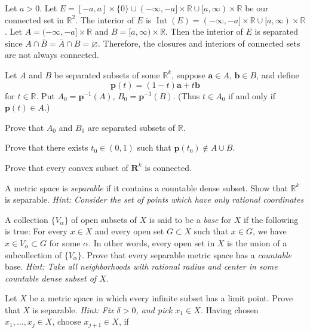 \begin{exercise}
  Let \(a > 0\).
  Let \(E = [-a,a]\times\{0\}\cup (-\infty,-a]\times\mathbb{R}\cup
  [a,\infty)\times\mathbb{R}\) be our connected set in \(\mathbb{R}^2\).
  The interior of \(E\) is
  \(\operatorname{Int}(E) = (-\infty,-a]\times\mathbb{R}\cup
  [a,\infty)\times\mathbb{R}\).
  Let \(A = (-\infty,-a]\times\mathbb{R}\) and
  \(B = [a,\infty)\times\mathbb{R}\).
  Then the interior of \(E\) is separated since
  \(A\cap\bar{B} = \bar{A}\cap B = \varnothing\).
  Therefore, the closures and interiors of connected sets are not always
  connected.
\item
  Let \(A\) and \(B\) be separated subsets of some \(\mathbb{R}^k\), suppose
  \(\mathbold{a}\in A\), \(\mathbold{b}\in B\), and define
  \[
  \mathbold{p}(t) = (1 - t)\mathbold{a} + t\mathbold{b}
  \]
  for \(t\in\mathbb{R}\).
  Put \(A_0 = \mathbold{p}^{-1}(A)\), \(B_0 = \mathbold{p}^{-1}(B)\).
  (Thus \(t\in A_0\) if and only if \(\mathbold{p}(t)\in A\).)
  \begin{exercise}[label = (\alph*)]
  \item
    Prove that \(A_0\) and \(B_0\) are separated subsets of \(\mathbb{R}\).
  \item
    Prove that there exists \(t_0\in (0, 1)\) such that
    \(\mathbold{p}(t_0)\not\in A\cup B\).
  \item
    Prove that every convex subset of \(\mathbold{R}^k\) is connected.
  \end{exercise}
\item
  \label{2.22}
  A metric space is \textit{separable} if it contains a countable dense subset.
  Show that \(\mathbb{R}^k\) is separable.
  \textit{Hint: Consider the set of points which have only rational
    coordinates}
\item
  \label{2.23}
  A collection \(\{V_{\alpha}\}\) of open subsets of \(X\) is said to be a
  \textit{base} for \(X\) if the following is true: For every \(x\in X\) and
  every open set \(G\subset X\) such that \(x\in G\), we have
  \(x\in V_{\alpha}\subset G\) for some \(\alpha\).
  In other words, every open set in \(X\) is the union of a subcollection of
  \(\{V_{\alpha}\}\).
  Prove that every separable metric space has a \textit{countable} base.
  \textit{Hint: Take all neighborhoods with rational radius and center in some
    countable dense subset of \(X\).}
\item
  \label{2.24}
  Let \(X\) be a metric space in which every infinite subset has a limit point.
  Prove that \(X\) is separable.
  \textit{Hint: Fix \(\delta > 0\), and pick \(x_1\in X\).}
  Having chosen \(x_1,\ldots,x_j\in X\), choose \(x_{j + 1}\in X\), if

\end{exercise}

